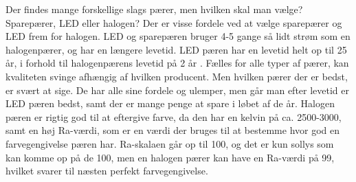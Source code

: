 Der findes mange forskellige slags pærer, men hvilken skal man vælge? Sparepærer, LED eller halogen?
Der er visse fordele ved at vælge sparepærer og LED frem for halogen. LED og sparepæren bruger 4-5 gange så lidt strøm som en halogenpærer, og har en længere levetid. LED pæren \cite{LED} har en levetid helt op til 25 år, i forhold til halogenpærens levetid på 2 år \cite{vaelg_paere}.
Fælles for alle typer af pærer, kan kvaliteten svinge afhængig af hvilken producent. Men hvilken pærer der er bedst, er svært at sige. De har alle sine fordele og ulemper, men går man efter levetid er LED pæren bedst, samt der er mange penge at spare i løbet af de år. Halogen pæren er rigtig god til at eftergive farve, da den har en kelvin på ca. 2500-3000, samt en høj Ra-værdi, som er en værdi der bruges til at bestemme hvor god en farvegengivelse pæren har. 
Ra-skalaen går op til 100, og det er kun sollys som kan komme op på de 100, men en halogen pærer \cite{halogen_paere} kan have en Ra-værdi på 99, hvilket svarer til næsten perfekt farvegengivelse. 

